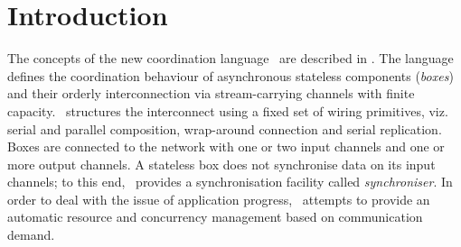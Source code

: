 \chapter*{Introduction}
%
The concepts of the new coordination language \ak\ are described in \cite{astrakahn}. The language defines the coordination behaviour of asynchronous stateless components (\emph{boxes}) and their orderly interconnection via stream-carrying channels with finite capacity. \ak\ structures the interconnect using a fixed set of wiring primitives, viz. serial and parallel composition, wrap-around connection and serial replication. Boxes are connected to the network with one or two input channels and one or more output channels. A stateless box does not synchronise data on its input channels; to this end, \ak\ provides a synchronisation facility called \emph{synchroniser}. In order to deal with the issue of application progress, \ak\ attempts to provide an automatic resource and concurrency management based on communication demand.



